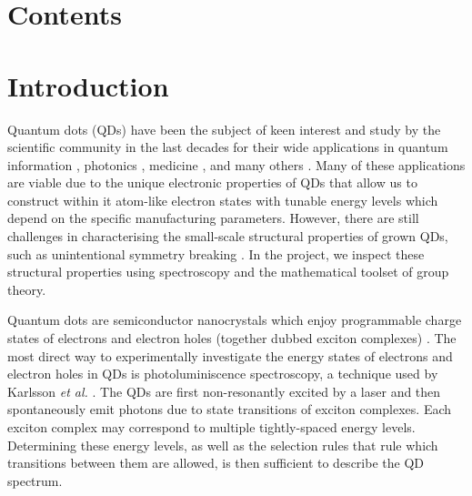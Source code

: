 \documentclass[12pt]{article}
\numberwithin{equation}{section}
\begin{document}
\pagebreak

\section{Contents}


\renewcommand\contentsname{}

\begingroup
\let\clearpage\relax
\vspace{-1cm} %
\tableofcontents
\endgroup

\pagebreak

\section{Introduction}

Quantum dots (QDs) have been the subject of keen interest and study by the scientific community in the last decades for their wide applications in quantum information \cite{quantum_information1, quantum_information2}, photonics \cite{photonics1, photonics2}, medicine \cite{medicine1, medicine2}, and many others \cite{other_applications}. Many of these applications are viable due to the unique electronic properties of QDs that allow us to construct within it atom-like electron states \cite{atomlike} with tunable energy levels \cite{tunable} which depend on the specific manufacturing parameters. However, there are still challenges in characterising the small-scale structural properties of grown QDs, such as unintentional symmetry breaking \cite{karlsson}. In the project, we inspect these structural properties using spectroscopy and the mathematical toolset of group theory.

Quantum dots are semiconductor nanocrystals \cite{other_applications} which enjoy programmable charge states of electrons and electron holes (together dubbed exciton complexes) \cite{charge_state}. The most direct way to experimentally investigate the energy states of electrons and electron holes in QDs is photoluminiscence spectroscopy, a technique used by Karlsson \textit{et al.} \cite{karlsson}. The QDs are first non-resonantly excited by a laser and then spontaneously emit photons due to state transitions of exciton complexes. Each exciton complex may correspond to multiple tightly-spaced energy levels. Determining these energy levels, as well as the selection rules that rule which transitions between them are allowed, is then sufficient to describe the QD spectrum.
\end{document}
